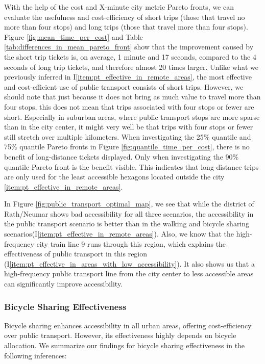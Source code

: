 With the help of the cost and X-minute city metric Pareto fronts, we can evaluate the usefulness and cost-efficiency of short trips (those that travel no more than four stops) and long trips (those that travel more than four stops).
Figure \ref{fig:mean_time_per_cost} and Table \ref{tab:differences_in_mean_pareto_front} show that the improvement caused by the short trip tickets is, on average, 1 minute and 17 seconds, compared to the 4 seconds of long trip tickets, and therefore almost 20 times larger.
Unlike what we previously inferred in I\ref{item:pt_effective_in_remote_areas}, the most effective and cost-efficient use of public transport consists of short trips.
However, we should note that just because it does not bring as much value to travel more than four stops, this does not mean that trips associated with four stops or fewer are short.
Especially in suburban areas, where public transport stops are more sparse than in the city center, it might very well be that trips with four stops or fewer still stretch over multiple kilometers.
When investigating the 25\% quantile and 75\% quantile Pareto fronts in Figure \ref{fig:quantile_time_per_cost}, there is no benefit of long-distance tickets displayed.
Only when investigating the 90\% quantile Pareto front is the benefit visible.
This indicates that long-distance trips are only used for the least accessible hexagons located outside the city \ref{item:pt_effective_in_remote_areas}.

In Figure \ref{fig:public_transport_optimal_map}, we see that while the district of Rath/Neumar shows bad accessibility for all three scenarios, the accessibility in the public transport scenario is better than in the walking and bicycle sharing scenarios(I\ref{item:pt_effective_in_remote_areas}).
Also, we know that the high-frequency city train line 9 runs through this region, which explains the effectiveness of public transport in this region (I\ref{item:pt_effective_in_areas_with_low_accessibility}).
It also shows us that a high-frequency public transport line from the city center to less accessible areas can significantly improve accessibility.

\subsubsection{Bicycle Sharing Effectiveness}
Bicycle sharing enhances accessibility in all urban areas, offering cost-efficiency over public transport.
However, its effectiveness highly depends on bicycle allocation.
We summarize our findings for bicycle sharing effectiveness in the following inferences:

